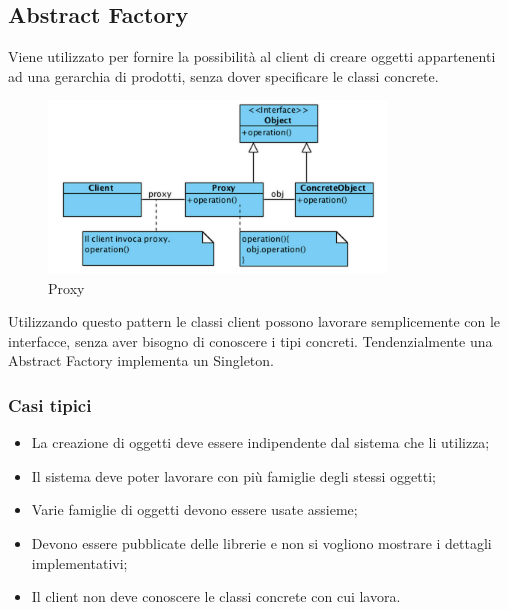 \subsection{Abstract Factory}
Viene utilizzato per fornire la possibilità al client di creare oggetti appartenenti ad una gerarchia di prodotti, senza dover specificare le classi concrete.
\begin{figure}[ht]
    \centering
    \includegraphics[width=0.8\textwidth]{immagini/proxy.png}
    \caption{Proxy}
\end{figure}
\FloatBarrier

Utilizzando questo pattern le classi client possono lavorare semplicemente con le interfacce, senza aver bisogno di conoscere i tipi concreti.
Tendenzialmente una Abstract Factory implementa un Singleton.

\subsubsection{Casi tipici}
\begin{itemize}
\item La creazione di oggetti deve essere indipendente dal sistema che li utilizza;
\item Il sistema deve poter lavorare con più famiglie degli stessi oggetti;
\item Varie famiglie di oggetti devono essere usate assieme;
\item Devono essere pubblicate delle librerie e non si vogliono mostrare i dettagli implementativi;
\item Il client non deve conoscere le classi concrete con cui lavora.
\end{itemize}